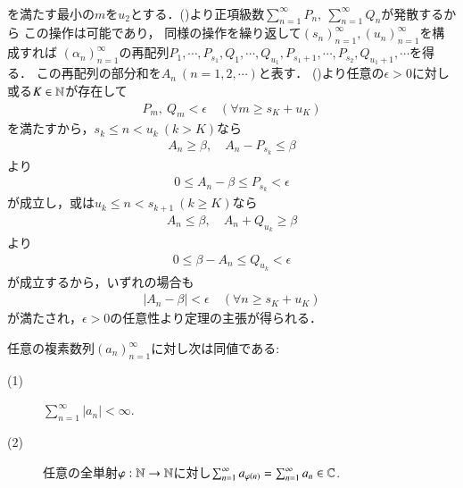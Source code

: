 \begin{prf}
\begin{align}
		\end{align}
		を満たす最小の$m$を$u_2$とする．()より正項級数$\sum_{n=1}^{\infty} P_n,\ \sum_{n=1}^{\infty} Q_n$が発散するから
		この操作は可能であり，
		同様の操作を繰り返して$(s_n)_{n=1}^{\infty},(u_n)_{n=1}^{\infty}$を構成すれば
		$(\alpha_n)_{n=1}^{\infty}$の再配列$P_1,\cdots,P_{s_1},Q_1,\cdots,Q_{u_1},P_{s_1+1},\cdots,P_{s_2},Q_{u_1+1},\cdots$を得る．
		この再配列の部分和を$A_n\ (n=1,2,\cdots)$と表す．
		()より任意の$\epsilon > 0$に対し或る$K \in \mathbb{N}$が存在して
		\begin{align}
			P_m,\ Q_m < \epsilon
			\quad ( \forall m \geq s_K + u_K )
		\end{align}
		を満たすから，$s_k \leq n < u_k\ (k > K)$なら
		\begin{align}
			A_n \geq \beta,
			\quad A_n - P_{s_k} \leq \beta
		\end{align}
		より
		\begin{align}
			0 \leq A_n - \beta \leq P_{s_k} < \epsilon
		\end{align}
		が成立し，或は$u_k \leq n < s_{k+1}\ (k \geq K)$なら
		\begin{align}
			A_n \leq \beta,
			\quad A_n + Q_{u_k} \geq \beta
		\end{align}
		より
		\begin{align}
			0 \leq \beta - A_n \leq Q_{u_k} < \epsilon
		\end{align}
		が成立するから，いずれの場合も
		\begin{align}
			|A_n - \beta| < \epsilon \quad ( \forall n \geq s_K + u_K )
		\end{align}
		が満たされ，$\epsilon > 0$の任意性より定理の主張が得られる．
		\QED
	\end{prf}
	
	\begin{screen}
		\begin{cor}[絶対収束と無条件収束は同値]
			任意の複素数列$(a_n)_{n=1}^{\infty}$に対し次は同値である:
			\begin{description}
				\item[(1)] $\sum_{n=1}^{\infty} |a_n| < \infty$.
				\item[(2)] 任意の全単射$\varphi:\mathbb{N} \rightarrow \mathbb{N}$に対し$\sum_{n=1}^{\infty} a_{\varphi(n)} = \sum_{n=1}^{\infty} a_n \in \mathbb{C}$.
			\end{description}
			\label{cor:Riemann_series}
		\end{cor}
	\end{screen}
	
